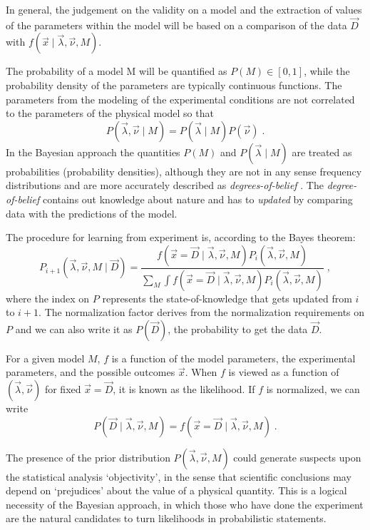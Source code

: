 In general, the judgement on the validity on a model and the extraction of values of the parameters within the model will be based on a comparison of the data $\vec{D}$ with $f(\vec{x}\mid\vec{\lambda},\vec{\nu},M)$.

 The probability of a model M will be quantified as $P(M)\in[0,1]$, while the probability density of the parameters are typically continuous functions. The parameters from the modeling of the experimental conditions are not correlated to the parameters of the physical model so that
\[P(\vec{\lambda},\vec{\nu}\mid M)=P(\vec{\lambda}\mid M)P(\vec{\nu})\;.\]
In the Bayesian approach the quantities $P(M)$ and $P(\vec{\lambda}\mid M)$ are treated as probabilities (probability densities), although they are not in any sense frequency distributions and are more accurately described as \emph{degrees-of-belief} \cite{bayesbook}. The \emph{degree-of-belief} contains out knowledge about nature and has to \emph{updated} by comparing data with the predictions of the model.

The procedure for learning from experiment is, according to the Bayes theorem:
\[P_{i+1}(\vec{\lambda},\vec{\nu},M\mid\vec{D})=\frac{f(\vec{x}=\vec{D}\mid\vec{\lambda},\vec{\nu},M)P_i(\vec{\lambda},\vec{\nu},M)}{\sum_M\int f(\vec{x}=\vec{D}\mid\vec{\lambda},\vec{\nu},M)P_i(\vec{\lambda},\vec{\nu},M)}\;,\]
where the index on $P$ represents the state-of-knowledge that gets updated from $i$ to $i+1$. The normalization factor derives from the normalization requirements on $P$ and we can also write it as $P(\vec{D})$, the probability to get the data $\vec{D}$.

For a given model $M$, $f$ is a function of the model parameters, the experimental parameters, and the possible outcomes $\vec{x}$. When $f$ is viewed as a function of $(\vec{\lambda},\vec{\nu})$ for fixed $\vec{x}=\vec{D}$, it is known as the likelihood. If $f$ is normalized, we can write
\[P(\vec{D}\mid\vec{\lambda},\vec{\nu},M)=f(\vec{x}=\vec{D}\mid\vec{\lambda},\vec{\nu},M)\;.\]

 The presence of the prior distribution $P(\vec{\lambda},\vec{\nu},M)$ could generate suspects upon the statistical analysis `objectivity', in the sense that scientific conclusions may depend on `prejudices' about the value of a physical quantity. This is a logical necessity of the Bayesian approach, in which those who have done the experiment are the natural candidates to turn likelihoods in probabilistic statements.

